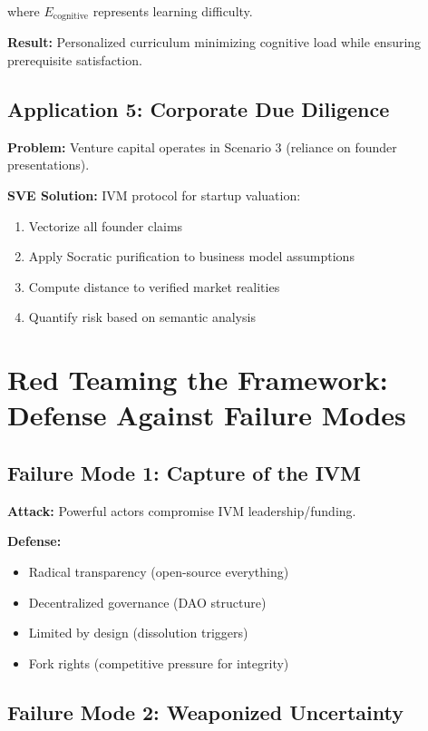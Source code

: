 \documentclass[11pt,a4paper]{article}
\theoremstyle{definition}
\theoremstyle{remark}
\begin{document}
where $E_{\text{cognitive}}$ represents learning difficulty.

\textbf{Result:} Personalized curriculum minimizing cognitive load while ensuring prerequisite satisfaction.

\subsection{Application 5: Corporate Due Diligence}

\textbf{Problem:} Venture capital operates in Scenario 3 (reliance on founder presentations).

\textbf{SVE Solution:} IVM protocol for startup valuation:
\begin{enumerate}
\item Vectorize all founder claims
\item Apply Socratic purification to business model assumptions
\item Compute distance to verified market realities
\item Quantify risk based on semantic analysis
\end{enumerate}

\section{Red Teaming the Framework: Defense Against Failure Modes}

\subsection{Failure Mode 1: Capture of the IVM}

\textbf{Attack:} Powerful actors compromise IVM leadership/funding.

\textbf{Defense:}
\begin{itemize}
\item Radical transparency (open-source everything)
\item Decentralized governance (DAO structure)
\item Limited by design (dissolution triggers)
\item Fork rights (competitive pressure for integrity)
\end{itemize}

\subsection{Failure Mode 2: Weaponized Uncertainty}
\end{document}
